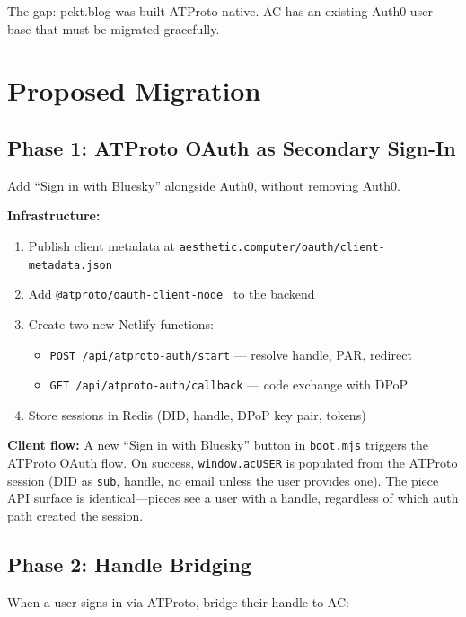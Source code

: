 \documentclass[10pt,letterpaper,twocolumn]{article}
\begin{document}
The gap: pckt.blog was built ATProto-native. AC has an existing Auth0 user base that must be migrated gracefully.


\section{Proposed Migration}
\label{sec:migration}

\subsection{Phase 1: ATProto OAuth as Secondary Sign-In}

Add ``Sign in with Bluesky'' alongside Auth0, without removing Auth0.

\textbf{Infrastructure:}
\begin{enumerate}
  \item Publish client metadata at \texttt{aesthetic.computer/oauth/client-metadata.json}
  \item Add \texttt{@atproto/oauth-client-node}~\citep{npmAtprotoOauth} to the backend
  \item Create two new Netlify functions:
    \begin{itemize}
      \item \texttt{POST /api/atproto-auth/start} --- resolve handle, PAR, redirect
      \item \texttt{GET /api/atproto-auth/callback} --- code exchange with DPoP
    \end{itemize}
  \item Store sessions in Redis (DID, handle, DPoP key pair, tokens)
\end{enumerate}

\textbf{Client flow:} A new ``Sign in with Bluesky'' button in \texttt{boot.mjs} triggers the ATProto OAuth flow. On success, \texttt{window.acUSER} is populated from the ATProto session (DID as \texttt{sub}, handle, no email unless the user provides one). The piece API surface is identical---pieces see a user with a handle, regardless of which auth path created the session.

\subsection{Phase 2: Handle Bridging}

When a user signs in via ATProto, bridge their handle to AC:
\end{document}
